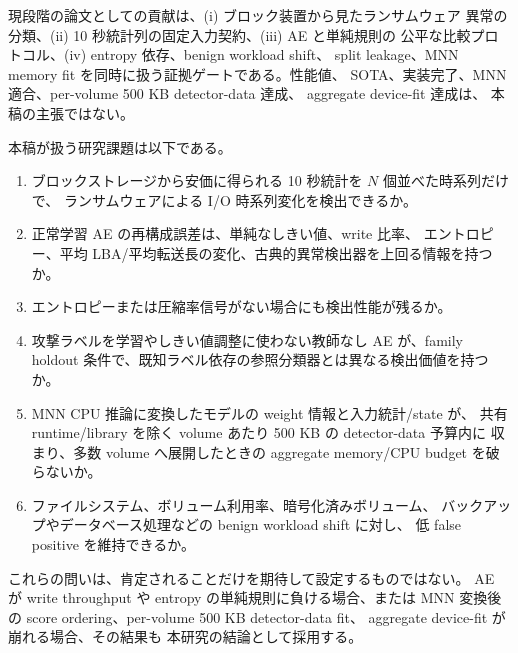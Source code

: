 現段階の論文としての貢献は、(i) ブロック装置から見たランサムウェア
異常の分類、(ii) 10 秒統計列の固定入力契約、(iii) AE と単純規則の
公平な比較プロトコル、(iv) entropy 依存、benign workload shift、
split leakage、MNN memory fit を同時に扱う証拠ゲートである。性能値、
SOTA、実装完了、MNN 適合、per-volume 500 KB detector-data 達成、
aggregate device-fit 達成は、
本稿の主張ではない。

本稿が扱う研究課題は以下である。

\begin{enumerate}
  \item ブロックストレージから安価に得られる 10 秒統計を
        $N$ 個並べた時系列だけで、
        ランサムウェアによる I/O 時系列変化を検出できるか。
  \item 正常学習 AE の再構成誤差は、単純なしきい値、write 比率、
        エントロピー、平均 LBA/平均転送長の変化、古典的異常検出器を上回る情報を持つか。
  \item エントロピーまたは圧縮率信号がない場合にも検出性能が残るか。
  \item 攻撃ラベルを学習やしきい値調整に使わない教師なし AE が、family holdout
        条件で、既知ラベル依存の参照分類器とは異なる検出価値を持つか。
  \item MNN CPU 推論に変換したモデルの weight 情報と入力統計/state が、
        共有 runtime/library を除く volume あたり 500 KB の detector-data 予算内に
        収まり、多数 volume へ展開したときの aggregate memory/CPU budget を破らないか。
  \item ファイルシステム、ボリューム利用率、暗号化済みボリューム、
        バックアップやデータベース処理などの benign workload shift に対し、
        低 false positive を維持できるか。
\end{enumerate}

これらの問いは、肯定されることだけを期待して設定するものではない。
AE が write throughput や entropy の単純規則に負ける場合、または
MNN 変換後の score ordering、per-volume 500 KB detector-data fit、
aggregate device-fit が崩れる場合、その結果も
本研究の結論として採用する。
